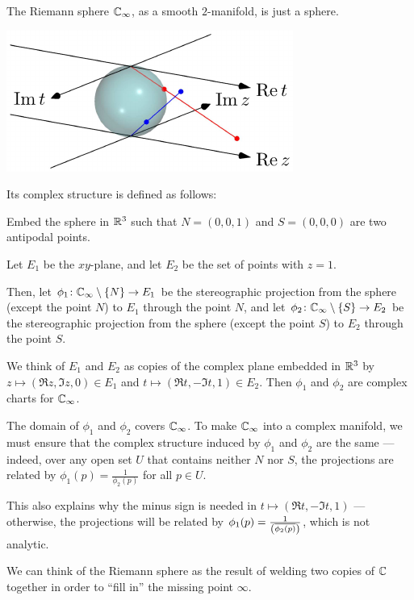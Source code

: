 \begin{example}
	\label{ex:riemann_sphere}
	The Riemann sphere $\mathbb C_\infty$, as a smooth $2$-manifold, is just a sphere.
	\begin{center}
		\includegraphics{3dfigures/pdf/riemsphere.pdf}
	\end{center}
	Its complex structure is defined as follows:

	Embed the sphere in $\mathbb R^3$ such that $N = (0, 0, 1)$ and $S = (0, 0, 0)$ are two antipodal
	points.

	Let $E_1$ be the $xy$-plane, and let $E_2$ be the set of points with $z = 1$.

	Then, let $\phi_1 \colon \mathbb C_\infty \setminus \{ N \} \to E_1$ be the stereographic projection
	from the sphere (except the point $N$) to $E_1$ through the point $N$,
	and let $\phi_2 \colon \mathbb C_\infty \setminus \{ S \} \to E_2$ be the stereographic projection
	from the sphere (except the point $S$) to $E_2$ through the point $S$.

	We think of $E_1$ and $E_2$ as copies of the complex plane embedded in $\mathbb R^3$ by $z \mapsto
	(\Re z, \Im z, 0) \in E_1$ and $t \mapsto (\Re t, -\Im t, 1) \in E_2$.
	Then $\phi_1$ and $\phi_2$ are complex charts for $\mathbb C_\infty$.

	The domain of $\phi_1$ and $\phi_2$ covers $\mathbb C_\infty$.
	To make $\mathbb C_\infty$ into a complex manifold, we must ensure that the complex structure induced
	by $\phi_1$ and $\phi_2$ are the same --- indeed, over any open set $U$ that contains neither
	$N$ nor $S$, the projections are related by $\phi_1(p) = \frac{1}{\phi_2(p)}$ for all $p \in U$.

	This also explains why the minus sign is needed in $t \mapsto (\Re t, -\Im t, 1)$ ---
	otherwise, the projections will be related by
	$\phi_1(p) = \frac{1}{\left(\overline{\phi_2(p)}\right)}$, which is not analytic.

	We can think of the Riemann sphere as the result of welding two copies of $\mathbb C$ together in order
	to ``fill in'' the missing point $\infty$.
\end{example}

